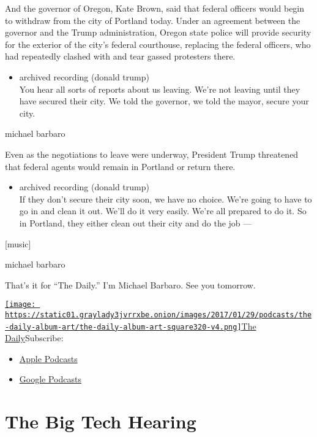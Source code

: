And the governor of Oregon, Kate Brown, said that federal officers would
begin to withdraw from the city of Portland today. Under an agreement
between the governor and the Trump administration, Oregon state police
will provide security for the exterior of the city's federal courthouse,
replacing the federal officers, who had repeatedly clashed with and tear
gassed protesters there.

\begin{itemize}
\tightlist
\item
  archived recording (donald trump)\\
  You hear all sorts of reports about us leaving. We're not leaving
  until they have secured their city. We told the governor, we told the
  mayor, secure your city.
\end{itemize}

michael barbaro

Even as the negotiations to leave were underway, President Trump
threatened that federal agents would remain in Portland or return there.

\begin{itemize}
\tightlist
\item
  archived recording (donald trump)\\
  If they don't secure their city soon, we have no choice. We're going
  to have to go in and clean it out. We'll do it very easily. We're all
  prepared to do it. So in Portland, they either clean out their city
  and do the job ---
\end{itemize}

{[}music{]}

michael barbaro

That's it for ``The Daily.'' I'm Michael Barbaro. See you tomorrow.

\href{https://www.nytimes3xbfgragh.onion/column/the-daily}{\texttt{[image: https://static01.graylady3jvrrxbe.onion/images/2017/01/29/podcasts/the-daily-album-art/the-daily-album-art-square320-v4.png]}The
Daily}Subscribe:

\begin{itemize}
\tightlist
\item
  \href{https://itunes.apple.com/us/podcast/id1200361736}{Apple
  Podcasts}
\item
  \href{https://www.google.com/podcasts?feed=aHR0cHM6Ly9yc3MuYXJ0MTkuY29tL3RoZS1kYWlseQ\%3D\%3D}{Google
  Podcasts}
\end{itemize}

\hypertarget{the-big-tech-hearing-1}{%
\section{The Big Tech Hearing}\label{the-big-tech-hearing-1}}

